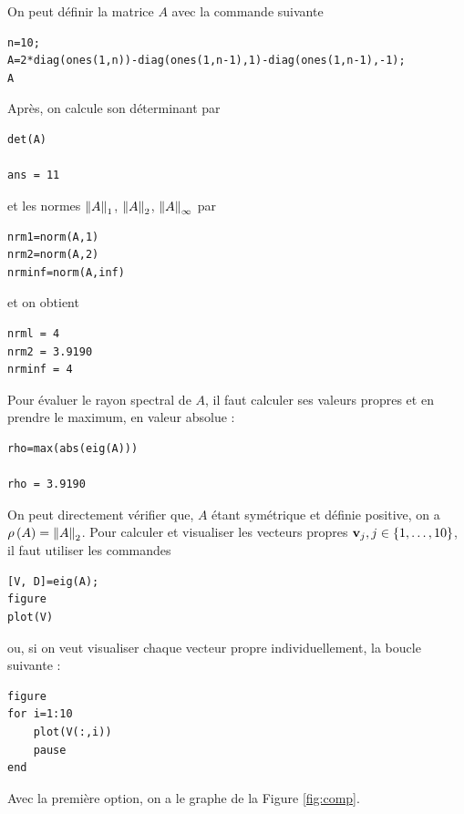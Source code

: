 On peut définir la matrice $A$ avec la commande suivante

\begin{verbatim}
n=10;
A=2*diag(ones(1,n))-diag(ones(1,n-1),1)-diag(ones(1,n-1),-1);
A
\end{verbatim}

Après, on calcule son déterminant par

\begin{verbatim}
det(A)

ans = 11
\end{verbatim}

et les normes $\left\lVert A\right\rVert_{1}$, $\left\lVert A\right\rVert_{2}$, $\left\lVert A\right\rVert_{\infty}$ par

\begin{verbatim}
nrm1=norm(A,1)
nrm2=norm(A,2)
nrminf=norm(A,inf)
\end{verbatim}

et on obtient

\begin{verbatim}
nrml = 4
nrm2 = 3.9190
nrminf = 4
\end{verbatim}


Pour évaluer le rayon spectral de $A$, il faut calculer ses valeurs propres et en prendre le maximum, en valeur absolue :
 
\begin{verbatim}
rho=max(abs(eig(A)))

rho = 3.9190
\end{verbatim}
 
On peut directement vérifier que, $A$ étant symétrique et définie positive, on a $\rho \left(A\right) = \left\lVert A\right\rVert_{2}$.
Pour calculer et visualiser les vecteurs propres $\mathbf{v}_{j}, j \in \left\{1, \dots, 10\right\}$, il faut utiliser les commandes

\begin{verbatim}
[V, D]=eig(A);
figure
plot(V)
\end{verbatim}


ou, si on veut visualiser chaque vecteur propre individuellement, la boucle suivante :
 
\begin{verbatim}
figure
for i=1:10
    plot(V(:,i))
    pause
end
\end{verbatim}

Avec la première option, on a le graphe de la Figure \ref{fig:comp}.

